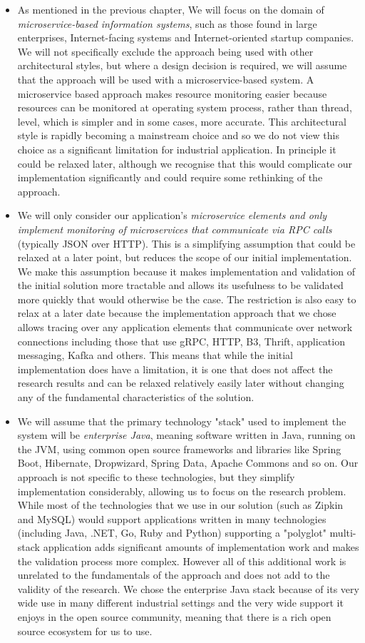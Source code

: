 \begin{itemize}
	\item As mentioned in the previous chapter, We will focus on the domain of \emph{microservice-based information systems}, such as those found in large enterprises, Internet-facing systems and Internet-oriented startup companies.  We will not specifically exclude the approach being used with other architectural styles, but where a design decision is required, we will assume that the approach will be used with a microservice-based system.  A microservice based approach makes resource monitoring easier because resources can be monitored at operating system process, rather than thread, level, which is simpler and in some cases, more accurate.  This architectural style is rapidly becoming a mainstream choice and so we do not view this choice as a significant limitation for industrial application.  In principle it could be relaxed later, although we recognise that this would complicate our implementation significantly and could require some rethinking of the approach.
	\item We will only consider our application's \emph{microservice elements and only implement monitoring of microservices that communicate via RPC calls} (typically JSON over HTTP).  This is a simplifying assumption that could be relaxed at a later point, but reduces the scope of our initial implementation.  We make this assumption because it makes implementation and validation of the initial solution more tractable and allows its usefulness to be validated more quickly that would otherwise be the case.  The restriction is also easy to relax at a later date because the implementation approach that we chose allows tracing over any application elements that communicate over network connections including those that use gRPC, HTTP, B3, Thrift, application messaging, Kafka and others.  This means that while the initial implementation does have a limitation, it is one that does not affect the research results and can be relaxed relatively easily later without changing any of the fundamental characteristics of the solution. 
	\item We will assume that the primary technology "stack" used to implement the system will be \emph{enterprise Java}, meaning software written in Java, running on the JVM, using common open source frameworks and libraries like Spring Boot, Hibernate, Dropwizard, Spring Data, Apache Commons and so on.  Our approach is not specific to these technologies, but they simplify implementation considerably, allowing us to focus on the research problem.  While most of the technologies that we use in our solution (such as Zipkin and MySQL) would support applications written in many technologies (including Java, .NET, Go, Ruby and Python) supporting a "polyglot" multi-stack application adds significant amounts of implementation work and makes the validation process more complex.  However all of this additional work is unrelated to the fundamentals of the approach and does not add to the validity of the research.  We chose the enterprise Java stack because of its very wide use in many different industrial settings and the very wide support it enjoys in the open source community, meaning that there is a rich open source ecosystem for us to use.

\end{itemize}
